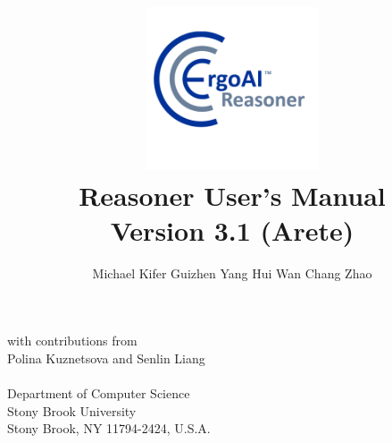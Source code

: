 \documentclass[11pt]{article}
\title{
  \includegraphics[width=2in]{../etc/ergoAI-bigicon-reasoner} 
  \vspace{0.7cm}\\
  \Huge \ERGOAI Reasoner User's Manual
  \vspace{3mm}\\
  {\LARGE Version 3.1 (Arete)}
}
\author{
  Michael Kifer
  \hspace{1cm}
  Guizhen Yang
  \hspace{1cm}
  Hui Wan
  \hspace{1cm}
  Chang Zhao
}
\date{}
\newcommand{\FLORA}{{\mbox{\smaller{\sc ${\cal F}${lora}\rm\emph{-2}}}}\xspace}
\newcommand{\ERGO}{\mbox{\smaller{\ensuremath{\cal{E}}\smaller{{\sc{RGO}}}}}\xspace}
\newcommand{\FLSYSTEM}{\ERGO}
\newcommand{\comment}[1]{}
\newcommand{\FLORAone}{{\mbox{${\cal F}${\sc lora}\emph{-1}}}\xspace}
\newcommand{\FLORID}{{\mbox{\sc Florid}}\xspace}
\newcommand{\fl}{\mbox{F-logic}\xspace}
\begin{document}
\maketitle

\begin{center}
  \large
 with contributions from \\
 \large
 Polina Kuznetsova and Senlin Liang
  \\~\\
  Department of Computer Science\\
  Stony Brook University\\
  Stony Brook, NY 11794-2424, U.S.A.
 \vspace{1.4cm}\\
  \monthname ~\the\year
\end{center}

\thispagestyle{empty}

\newpage

\setcounter{page}{1}

\tableofcontents

\newpage

\setcounter{page}{1}


\comment{
which contains many important extensions and enhancements to \FLORA,
and is proprietary to Coherent Knowledge Systems.
\FLSYSTEM is implemented as a set of run-time
libraries and a compiler that translates a unified language of \fl
\cite{KLW95}, HiLog \cite{hilog-jlp}, Transaction Logic
\cite{trans-chapter-98,trans-tcs94}, and defeasible reasoning
\cite{lpda-iclp-09} into tabled Prolog code.

Applications of \FLSYSTEM include intelligent agents, Semantic Web, ontology
management, integration of information, and others. 

\index{FLIP}
\index{FLORID}
The language of \FLSYSTEM is a dialect of \fl with
numerous extensions, which include a natural way to do meta-programming in
the style of HiLog, logical updates in the style of Transaction
Logic, and a form of \emph{defeasible reasoning} described in
\cite{lpda-iclp-09}. \FLSYSTEM was designed with extensibility and flexibility in mind, and
it provides strong support for modular software development through its unique
feature of on-the-fly modules.
Other extensions, such as the versatile syntax of \FLORID path
expressions, are borrowed from
\FLORID, a C++-based \fl system developed at
Freiburg University.\footnote{
  \url{http://www.informatik.uni-freiburg.de/~dbis/florid/}.
}
Extensions aside, the syntax of \FLSYSTEM differs in many
important ways from \FLORID, from the original version of \fl, as described
in \cite{KLW95}, and from an earlier implementation, \FLORAone. These
syntax changes made the system more user-friendly and practical.

\FLSYSTEM is available at \url{http://flora.sourceforge.net}.
This manual will mostly refer to the system under its traditional name,
\FLSYSTEM.
}
\end{document}
